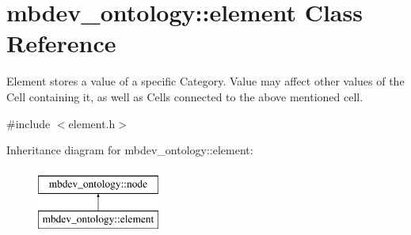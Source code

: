\hypertarget{classmbdev__ontology_1_1element}{\section{mbdev\-\_\-ontology\-:\-:element \-Class \-Reference}
\label{classmbdev__ontology_1_1element}
}


\-Element stores a value of a specific \-Category. \-Value may affect other values of the \-Cell containing it, as well as \-Cells connected to the above mentioned cell.  




{\ttfamily \#include $<$element.\-h$>$}

\-Inheritance diagram for mbdev\-\_\-ontology\-:\-:element\-:\begin{figure}[H]
\begin{center}
\leavevmode
\includegraphics[height=2.000000cm]{classmbdev__ontology_1_1element}
\end{center}
\end{figure}
